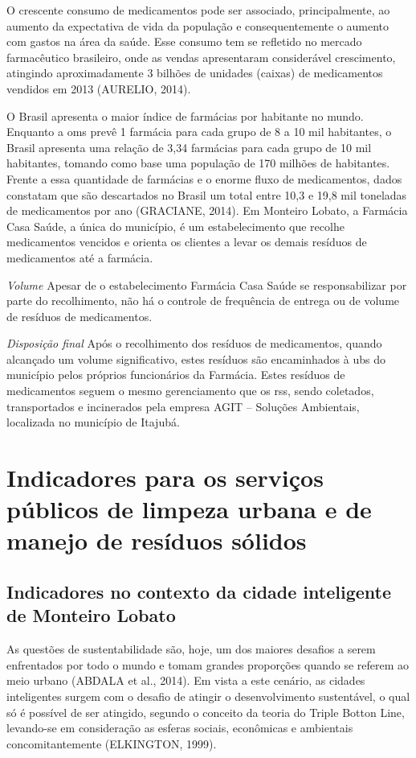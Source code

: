 \begin{description}
	O crescente consumo de medicamentos pode ser associado, principalmente, ao aumento da expectativa de vida da população e consequentemente o aumento com gastos na área da saúde. Esse consumo tem se refletido no mercado farmacêutico brasileiro, onde as vendas apresentaram considerável crescimento, atingindo aproximadamente 3 bilhões de unidades (caixas) de medicamentos vendidos em 2013 (AURELIO, 2014).
	
	O Brasil apresenta o maior índice de farmácias por habitante no mundo. Enquanto a \gls{oms} prevê 1 farmácia para cada grupo de 8 a 10 mil habitantes, o Brasil apresenta uma relação de 3,34 farmácias para cada grupo de 10 mil habitantes, tomando como base uma população de 170 milhões de habitantes. Frente a essa quantidade de farmácias e o enorme fluxo de medicamentos, dados constatam que são descartados no Brasil um total entre 10,3 e 19,8 mil toneladas de medicamentos por ano (GRACIANE, 2014).
	Em Monteiro Lobato, a Farmácia Casa Saúde, a única do município, é um estabelecimento que recolhe medicamentos vencidos e orienta os clientes a levar os demais resíduos de medicamentos até a farmácia.
	
	\subitem \textit{Volume}
	Apesar de o estabelecimento Farmácia Casa Saúde se responsabilizar por parte do recolhimento, não há o controle de frequência de entrega ou de volume de resíduos de medicamentos.
	
	\subitem \textit{Disposição final}
	Após o recolhimento dos resíduos de medicamentos, quando alcançado um volume significativo, estes resíduos são encaminhados à \gls{ubs} do município pelos próprios funcionários da Farmácia.
	Estes resíduos de medicamentos seguem o mesmo gerenciamento que os \gls{rss}, sendo coletados, transportados e incinerados pela empresa AGIT – Soluções Ambientais, localizada no município de Itajubá.
	
\end{description}

\newpage
\section{Indicadores para os serviços públicos de limpeza urbana e de manejo de resíduos sólidos}

\subsection{Indicadores no contexto da cidade inteligente de Monteiro Lobato}
As questões de sustentabilidade são, hoje, um dos maiores desafios a serem enfrentados por todo o mundo e tomam grandes proporções quando se referem ao meio urbano (ABDALA et al., 2014). Em vista a este cenário, as cidades inteligentes surgem com o desafio de atingir o desenvolvimento sustentável, o qual só é possível de ser atingido, segundo o conceito da teoria do Triple Botton Line, levando-se em consideração as esferas sociais, econômicas e ambientais concomitantemente (ELKINGTON, 1999).

